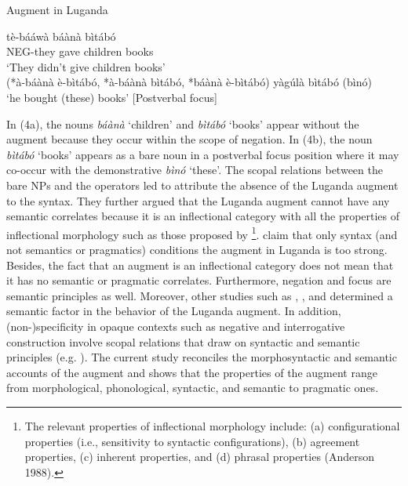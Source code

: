 \documentclass[output=paper]{langscibook}
\begin{document}
\begin{exe}
\ex Augment in Luganda
\label{hayagusii4}
\begin{xlist}
\ex \gll	tè-bááwà               báànà    bìtábó \\			
            NEG-they gave    children    books \\
      \trans     ‘They didn’t give children books’\\
           (*à-báànà  è-bìtábó, *à-báànà  bìtábó, *báànà  è-bìtábó)  
\ex 	yàgúlà  bìtábó  (bìnó) \\
        ‘he bought (these) books’  [Postverbal focus]
\end{xlist}
\end{exe}
In (4a), the nouns \textit{báànà} ‘children’ and \textit{bìtábó} ‘books’ appear without the augment because they occur within the scope of negation. In (4b), the noun \textit{bìtábó} ‘books’ appears as a bare noun in a postverbal focus position where it may co-occur with the demonstrative \textit{bìnó} ‘these’. The scopal relations between the bare NPs and the operators led \citet{hyman1993augment} to attribute the absence of the Luganda augment to the syntax. They further argued that the Luganda augment cannot have any semantic correlates because it is an inflectional category with all the properties of inflectional morphology such as those proposed by \cite{anderson1988inflection}\footnote{The relevant properties of inflectional morphology include: (a) configurational properties (i.e., sensitivity to syntactic configurations), (b) agreement properties, (c) inherent properties, and (d) phrasal properties (Anderson 1988).}. \citet{hyman1993augment} claim that only syntax (and not semantics or pragmatics) conditions the augment in Luganda is too strong. Besides, the fact that an augment is an inflectional category does not mean that it has no semantic or pragmatic correlates. Furthermore, negation and focus are semantic principles as well. Moreover, other studies such as \citet[30]{ashton1987luganda}, \citet{mould1974syntax}, and \citet{ferrari2009} determined a semantic factor in the behavior of the Luganda augment. In addition, (non-)specificity in opaque contexts such as negative and interrogative construction involve scopal relations that draw on syntactic and semantic principles (e.g. \citep{abusch1993scope,lyons1999definiteness,winter1997choice}). The current study reconciles the morphosyntactic and semantic accounts of the augment and shows that the properties of the augment range from morphological, phonological, syntactic, and semantic to pragmatic ones.
	
\end{document}

